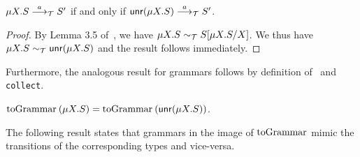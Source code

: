
\begin{lemma}
  \label{lemma:unravelling}
  $\mu X. S \LTSderives[a] S'$ if and only if $\Unravel (\mu X. S) \LTSderives[a] S'$.
\end{lemma}
%
\begin{proof}
  By Lemma 3.5 of~\cite{thiemann2016context}, we have
  $\mu X.S \TypeEquiv S[\mu X. S / X]$. We thus have
  $\mu X.S \TypeEquiv \Unravel (\mu X. S)$ and the result follows
  immediately.
\end{proof}

Furthermore, the analogous result for grammars follows
by definition of \toGrammark\ and \lstinline|collect|.

\begin{lemma}
\label{lemma:unravelling_preserves_grammars}
	$\toGrammarf{(\mu X.S)} = \toGrammarf{(\Unravel (\mu X. S))}$.
\end{lemma}

The following result states that grammars in the image of
$\toGrammark$ mimic the transitions of the corresponding types
and vice-versa.

